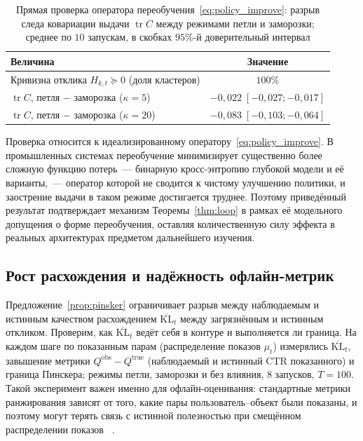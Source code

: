 \begin{table}[H]
    \caption{Прямая проверка оператора переобучения~\eqref{eq:policy_improve}:
    разрыв следа ковариации выдачи $\operatorname{tr}C$ между режимами петли и
    заморозки; среднее по $10$ запускам, в скобках $95\%$-й доверительный интервал}
    \label{tab:klretrain}
    \centering
    \begin{tabular}{lc}
        \toprule
        Величина & Значение \\
        \midrule
        Кривизна отклика $H_{k,t}\succeq0$ (доля кластеров) & $100\%$ \\
        $\operatorname{tr}C$, петля $-$ заморозка ($\kappa=5$)  & $-0{,}022\;[-0{,}027;-0{,}017]$ \\
        $\operatorname{tr}C$, петля $-$ заморозка ($\kappa=20$) & $-0{,}083\;[-0{,}103;-0{,}064]$ \\
        \bottomrule
    \end{tabular}
\end{table}

Проверка относится к идеализированному оператору~\eqref{eq:policy_improve}. В
промышленных системах переобучение минимизирует существенно более сложную
функцию потерь~--- бинарную кросс-энтропию глубокой модели и её варианты,~---
оператор которой не сводится к чистому улучшению политики, и заострение выдачи в
таком режиме достигается труднее. Поэтому приведённый результат подтверждает
механизм Теоремы~\ref{thm:loop} в рамках её модельного допущения о форме
переобучения, оставляя количественную силу эффекта в реальных архитектурах
предметом дальнейшего изучения.

\subsection{Рост расхождения и надёжность офлайн-метрик}
\label{subsec:exp_klgap}

Предложение~\ref{prop:pinsker} ограничивает разрыв между наблюдаемым и истинным
качеством расхождением $\overline{\mathrm{KL}}_t$ между загрязнённым и истинным
откликом. Проверим, как $\overline{\mathrm{KL}}_t$ ведёт себя в контуре и
выполняется ли граница. На каждом шаге по показанным парам (распределение показов $\mu_t$)
измерялись $\overline{\mathrm{KL}}_t$, завышение метрики
$Q^{\mathrm{obs}}-Q^{\mathrm{true}}$ (наблюдаемый и истинный CTR показанного) и
граница Пинскера; режимы петли, заморозки и без влияния, $8$ запусков, $T=100$.
Такой эксперимент важен именно для офлайн-оценивания: стандартные метрики
ранжирования зависят от того, какие пары пользователь--объект были показаны, и
поэтому могут терять связь с истинной полезностью при смещённом распределении показов
~\cite{krichene2020, stoecker2025biasMitigation}.


